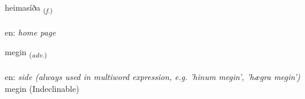 \documentclass[frontgrid, backgrid]{flacards}\usepackage[]{graphicx}\usepackage[]{color}
\begin{document}
\renewcommand{\flhead}{\vskip5pt \fboxsep=0pt {\small\bfseries\footnotesize Nafnorð | Noun}}
\renewcommand{\fcfoot}{\vskip5pt \fboxsep=0pt \hspace{2pt}{\small\bfseries\footnotesize 2K}}

\renewcommand{\blhead}{\vskip5pt {\small\bfseries\footnotesize Nafnorð | Noun }}
\renewcommand{\bcfoot}{\vskip5pt \hspace{2pt}{\small\bfseries\footnotesize 2K}}


{heimasíða \small{\textsubscript{(\textit{f.})}} \\[1ex] %
\textphonetic{[heiːmasiða]} \\
en: \emph{home page} \\  [2ex]
\renewcommand*{\arraystretch}{0.8}
}


\renewcommand{\flhead}{\vskip5pt \fboxsep=0pt {\small\bfseries\footnotesize Atviksorð | Adverb}}
\renewcommand{\fcfoot}{\vskip5pt \fboxsep=0pt \hspace{2pt}{\small\bfseries\footnotesize 2K}}

\renewcommand{\blhead}{\vskip5pt {\small\bfseries\footnotesize Atviksorð | Adverb }}
\renewcommand{\bcfoot}{\vskip5pt \hspace{2pt}{\small\bfseries\footnotesize 2K}}


{megin \small{\textsubscript{(\textit{adv.})}} \\[1ex]
\textphonetic{[meijɪn]} \\
en: \emph{side (always used in multiword expression, e.g. 'hinum megin', 'hægra megin')} \\  [2ex]
megin (Indeclinable)}

\renewcommand{\flhead}{\vskip5pt \fboxsep=0pt {\small\bfseries\footnotesize Nafnorð | Noun}}
\renewcommand{\fcfoot}{\vskip5pt \fboxsep=0pt \hspace{2pt}{\small\bfseries\footnotesize 2K}}
\end{document}
